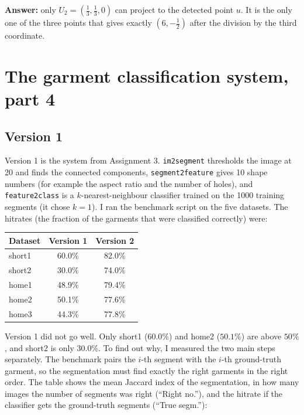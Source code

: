 \documentclass[11pt,a4paper]{article}
\begin{document}
\textbf{Answer:} only $U_2=(\tfrac13,\tfrac13,0)$ can project to the detected point $u$. It is the only
one of the three points that gives exactly $(6,-\tfrac12)$ after the division by the third coordinate.

\section{The garment classification system, part 4}

\subsection{Version 1}

Version 1 is the system from Assignment 3. \texttt{im2segment} thresholds the image at 20 and finds the connected
components, \texttt{segment2feature} gives 10 shape numbers (for example the aspect ratio and the number of
holes), and \texttt{feature2class} is a $k$-nearest-neighbour classifier trained on the 1000 training segments
(it chose $k=1$). I ran the benchmark script on the five datasets. The hitrates (the fraction of the garments that
were classified correctly) were:

\begin{center}
\begin{tabular}{lcc}
 Dataset & Version 1 & Version 2 \\ \hline
 short1 & 60.0\% & 82.0\% \\
 short2 & 30.0\% & 74.0\% \\
 home1  & 48.9\% & 79.4\% \\
 home2  & 50.1\% & 77.6\% \\
 home3  & 44.3\% & 77.8\% \\
\end{tabular}
\end{center}

Version 1 did not go well. Only short1 ($60.0\%$) and home2 ($50.1\%$) are
above $50\%$, and short2 is only $30.0\%$. To find out why, I measured the two main steps separately.
The benchmark pairs the $i$-th segment with the $i$-th ground-truth garment, so the segmentation must find exactly
the right garments in the right order. The table shows the mean Jaccard index of the segmentation, in how many images
the number of segments was right (``Right no.''), and the hitrate if the classifier gets the ground-truth segments (``True segm.''):
\end{document}
